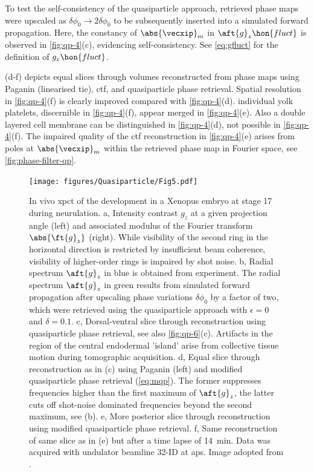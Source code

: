 \documentclass[
twoside,
openright,
titlepage,
numbers=noenddot,
headinclude,
fleqn,
a4paper,
footinclude=true,
cleardoublepage=empty,
abstractoff,
BCOR=5mm,
paper=a4,
fontsize=11pt,
british,ngerman,american,
]{scrreprt}
\begin{document}
To test the self-consistency of the quasiparticle approach, retrieved
phase maps were upscaled as $\delta\phi_0\to2\delta\phi_0$ to be
subsequently inserted into a simulated forward propagation.  Here, the
constancy of $\abs{\vecxip}_m$ in $\aft{g}_z\hon{fluct}$ is observed
in \cref{fig:qp-4}(c), evidencing self-consistency.  See
\cref{eq:gfluct} for the definition of $g_z\hon{fluct}$.

(d-f) depicts equal slices through volumes
reconstructed from phase maps using Paganin (linearised \ac{tie}),
\ac{ctf}, and quasiparticle phase retrieval.  Spatial resolution in
\cref{fig:qp-4}(f) is clearly improved compared with
\cref{fig:qp-4}(d). \Eg{} individual yolk platelets, discernible in
\cref{fig:qp-4}(f), appear merged in \cref{fig:qp-4}(e).  Also a
double layered cell membrane can be distinguished in
\cref{fig:qp-4}(d), not possible in \cref{fig:qp-4}(f).  The impaired
quality of the \ac{ctf} reconstruction in \cref{fig:qp-4}(e) arises
from poles at $\abs{\vecxip}_m$ within the retrieved phase map in
Fourier space, see \cref{fig:phase-filter-qp}.

\begin{figure}
  \centering
  \texttt{[image: figures/Quasiparticle/Fig5.pdf]}
  \caption[In vivo \ac{xpct} of Xenopus development during neurulation
  in a stage-17 embryo.]{In vivo \ac{xpct} of the development in a
    Xenopus embryo at stage 17 during neurulation.  a, Intensity
    contrast $g_z$ at a given projection angle (left) and associated
    modulus of the Fourier transform $\abs{\ft{g}_z}$ (right).  While
    visibility of the second ring in the horizontal direction is
    restricted by insufficient beam coherence, visibility of
    higher-order rings is impaired by shot noise.  b, Radial spectrum
    $\aft{g}_z$ in blue is obtained from experiment.  The radial
    spectrum $\aft{g}_z$ in green results from simulated forward
    propagation after upscaling phase variations $\delta\phi_0$ by a
    factor of two, which were retrieved using the quasiparticle
    approach with $\epsilon=0$ and $\delta=\num{0.1}$.  c,
    Dorsal-ventral slice through reconstruction using quasiparticle
    phase retrieval, see also \cref{fig:qp-6}(c).  Artifacts in the
    region of the central endodermal 'island' arise from collective
    tissue motion during tomographic acquisition.  d, Equal slice
    through reconstruction as in (c) using Paganin (left) and modified
    quasiparticle phase retrieval (\cref{eq:mqp}).  The former
    suppresses frequencies higher than the first maximum of
    $\aft{g}_z$, the latter cuts off shot-noise dominated frequencies
    beyond the second maximum, see (b).  e, More posterior slice
    through reconstruction using modified quasiparticle phase
    retrieval.  f, Same reconstruction of same slice as in (e) but
    after a time lapse of \SI{14}{min}.  Data was acquired with
    undulator beamline 32-ID at \ac{aps}.  Image adopted from
    \cite{Hofmann2014}.}
  \label{fig:qp-5}
\end{figure}
\end{document}
